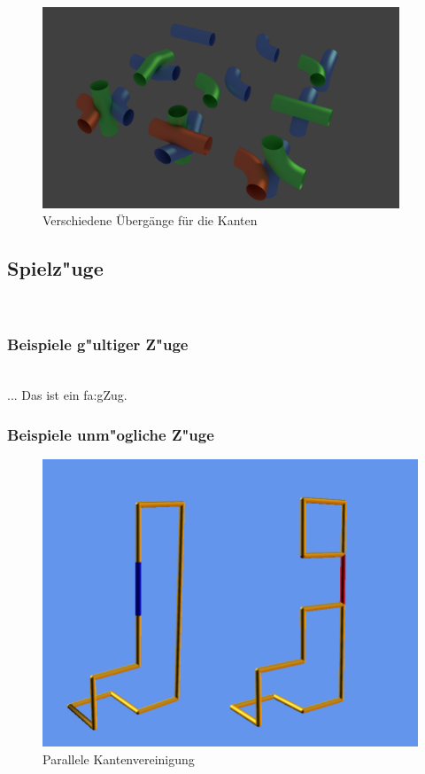	\begin{figure}[ht]
	  \centering
	  \includegraphics[width = 0.95\textwidth]{Inhalt/Nutzung/Grafiken/Grafische_Oberflaechen/Pipes2.png}
	  \caption{Verschiedene Übergänge für die Kanten}
	  \label{fig:pipes2}
	\end{figure}
	

\clearpage
	


\subsection{Spielz{"u}ge}~\\


\subsubsection{Beispiele g{"u}ltiger Z{"u}ge}


~\\
...
Das ist ein \gls{fa:gZug}.




\subsubsection{Beispiele unm{"o}gliche Z{"u}ge}

	\begin{figure}[htb]
	  \centering
	  \includegraphics[width = \textwidth]{Inhalt/Nutzung/Grafiken/Grafische_Oberflaechen/Ungueltiger_Zug.png}
	  \caption{Parallele Kantenvereinigung}
	  \label{fig:zug1}
	\end{figure}

